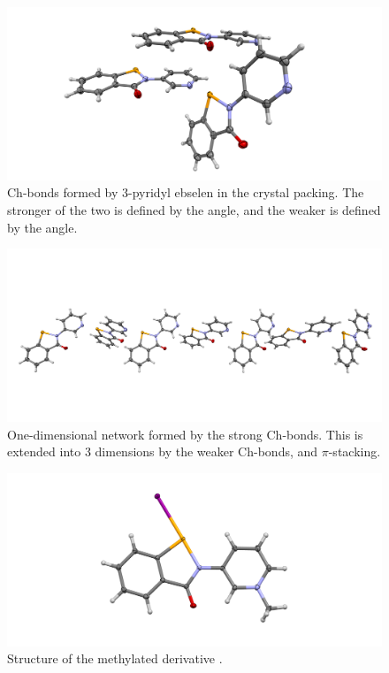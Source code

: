 \begin{refsection}
\begin{figure}
    \centering
    \includegraphics[width=\linewidth]{Figures/3py-ebs-chbonds.pdf}
    \caption{Ch-bonds formed by 3-pyridyl ebselen  in the crystal packing. The stronger of the two is defined by the  angle, and the weaker is defined by the  angle.}
    \label{fig:3py-ebs-chbonds}
\end{figure}

\begin{figure}
    \centering
    \includegraphics[width=\linewidth]{Figures/3py-ebs-chain.pdf}
    \caption{One-dimensional network formed by the strong  Ch-bonds. This is extended into 3 dimensions by the weaker  Ch-bonds, and $\pi$-stacking.}
    \label{fig:3py-ebs-chain}
\end{figure}

\begin{figure}
    \centering
    \includegraphics[width=0.6\linewidth]{Figures/3py-ebs-mei.pdf}
    \caption{Structure of the methylated derivative .}
    \label{fig:3py-ebs-mei}
\end{figure}


\end{refsection}
